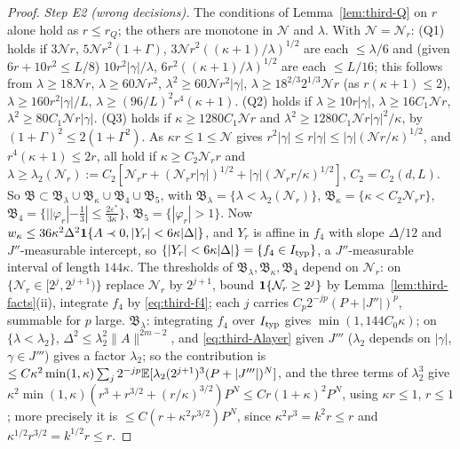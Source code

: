 \begin{proof}
\emph{Step E2 (wrong decisions).} The conditions of Lemma~\ref{lem:third-Q} on $r$ alone hold as $r\le r_Q$; the others are monotone in $\mathcal N$ and $\lambda$. With $\mathcal N=\mathcal N_r$: (Q1) holds if $3\mathcal Nr$, $5\mathcal Nr^2(1+\Gamma)$, $3\mathcal Nr^2((\kappa+1)/\lambda)^{1/2}$ are each $\le\lambda/6$ and (given $6r+10r^2\le L/8$) $10r^2|\gamma|/\lambda$, $6r^2((\kappa+1)/\lambda)^{1/2}$ are each $\le L/16$; this follows from $\lambda\ge18\mathcal Nr$, $\lambda\ge60\mathcal Nr^2$, $\lambda^2\ge60\mathcal Nr^2|\gamma|$, $\lambda\ge18^{2/3}2^{1/3}\mathcal Nr$ (as $r(\kappa+1)\le2$), $\lambda\ge160r^2|\gamma|/L$, $\lambda\ge(96/L)^2r^4(\kappa+1)$. (Q2) holds if $\lambda\ge10r|\gamma|$, $\lambda\ge16C_1\mathcal Nr$, $\lambda^2\ge80C_1\mathcal Nr|\gamma|$. (Q3) holds if $\kappa\ge1280C_1\mathcal Nr$ and $\lambda^2\ge1280C_1\mathcal Nr|\gamma|^2/\kappa$, by $(1+\Gamma)^2\le2(1+\Gamma^2)$. As $\kappa r\le1\le\mathcal N$ gives $r^2|\gamma|\le r|\gamma|\le|\gamma|(\mathcal Nr/\kappa)^{1/2}$, and $r^4(\kappa+1)\le2r$, all hold if $\kappa\ge C_2\mathcal N_rr$ and $\lambda\ge\lambda_2(\mathcal N_r):=C_2[\mathcal N_rr+(\mathcal N_rr|\gamma|)^{1/2}+|\gamma|(\mathcal N_rr/\kappa)^{1/2}]$, $C_2=C_2(d,L)$. So $\mathfrak B\subset\mathfrak B_\lambda\cup\mathfrak B_\kappa\cup\mathfrak B_4\cup\mathfrak B_5$, with $\mathfrak B_\lambda=\{\lambda<\lambda_2(\mathcal N_r)\}$, $\mathfrak B_\kappa=\{\kappa<C_2\mathcal N_rr\}$, $\mathfrak B_4=\{||\varphi_r|-\frac13|\le\frac{2\varepsilon^*}{3\kappa}\}$, $\mathfrak B_5=\{|\varphi_r|>1\}$. Now $w_\kappa\le36\kappa^2\Delta^2\mathbf 1\{A\prec0,|Y_r|<6\kappa|\Delta|\}$, and $Y_r$ is affine in $f_4$ with slope $\Delta/12$ and $J''$-measurable intercept, so $\{|Y_r|<6\kappa|\Delta|\}=\{f_4\in I_{\rm typ}\}$, a $J''$-measurable interval of length $144\kappa$. The thresholds of $\mathfrak B_\lambda,\mathfrak B_\kappa,\mathfrak B_4$ depend on $\mathcal N_r$: on $\{\mathcal N_r\in[2^j,2^{j+1})\}$ replace $\mathcal N_r$ by $2^{j+1}$, bound $\mathbf 1\{\mathcal N_r\ge2^j\}$ by Lemma~\ref{lem:third-facts}(ii), integrate $f_4$ by \eqref{eq:third-f4}; each $j$ carries $C_p2^{-jp}(P+|J''|)^p$, summable for $p$ large.
$\mathfrak B_\lambda$: integrating $f_4$ over $I_{\rm typ}$ gives $\min(1,144C_0\kappa)$; on $\{\lambda<\lambda_2\}$, $\Delta^2\le\lambda_2^2\|A\|^{2m-2}$, and \eqref{eq:third-Alayer} given $J'''$ ($\lambda_2$ depends on $|\gamma|$, $\gamma\in J'''$) gives a factor $\lambda_2$; so the contribution is $\le C\kappa^2\min(1,\kappa)\sum_j2^{-jp}\mathbb E[\lambda_2(2^{j+1})^3(P+|J'''|)^N]$, and the three terms of $\lambda_2^3$ give $\kappa^2\min(1,\kappa)(r^3+r^{3/2}+(r/\kappa)^{3/2})P^N\le Cr(1+\kappa)^2P^N$, using $\kappa r\le1$, $r\le1$; more precisely it is $\le C(r+\kappa^2r^{3/2})P^N$, since $\kappa^2r^3=k^2r\le r$ and $\kappa^{1/2}r^{3/2}=k^{1/2}r\le r$.

\end{proof}
